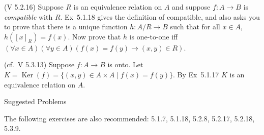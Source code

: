 \documentclass[answers,addpoints,12pt]{exam}
\newif\ifanswers
\theoremstyle{remark}
\newcommand{\Ker}{\ensuremath{\operatorname{Ker}}}
\newcommand{\id}{\ensuremath{\mathrm{id}}}
\begin{document}
\begin{questions}
  \newpage
  \question[2]  (V 5.2.16) 
  Suppose $R$ is an equivalence relation on $A$ and suppose $f \colon A \to B$
  is \emph{compatible} with $R$. Ex~5.1.18 gives the definition of compatible, and also asks 
  you to prove that there is a unique function $h \colon A/R \to B$ such that for all $x \in A$, $h([x]_R) = f(x)$.
  Now prove that $h$ is one-to-one iff 
  $(\forall x \in A)(\forall y \in A)(f(x) = f(y) \longrightarrow (x,y) \in R)$.%


\newpage
\question (cf.~V 5.3.13)
 Suppose $f \colon A \to B$ is onto. Let 
 $K = \Ker(f) = \{(x, y) \in  A \times A \mid f(x) = f(y)\}$.
 By Ex~5.1.17 $K$ is an equivalence relation on $A$.

\newpage
  \begin{center}
    {\sc  Suggested Problems}
  \end{center}
  
  The following exercises are also recommended:
  5.1.7, 5.1.18, 5.2.8, 5.2.17, 5.2.18, 5.3.9.
\end{questions}

\vfill
    \ifanswers \else 
    {\large \begin{center} \gradetable[v][pages] \end{center}  }
    \thispagestyle{empty}
    \fi
\end{document}
